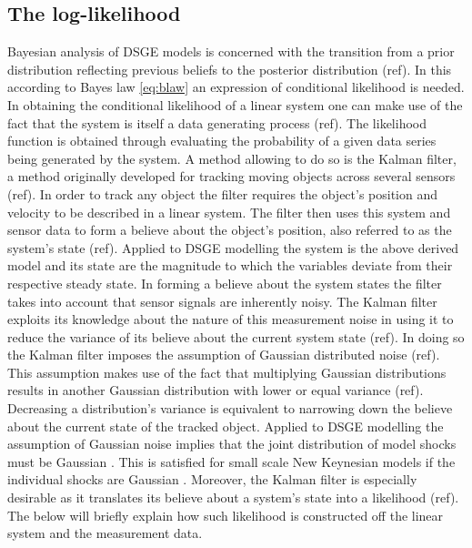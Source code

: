 \documentclass[12pt,a4paper,english]{article} %
\begin{document}
		
	\subsection{The log-likelihood}
	Bayesian analysis of DSGE models is concerned with the transition from a prior distribution reflecting previous beliefs to the posterior distribution (ref). In this according to Bayes law \ref{eq:blaw} an expression of conditional likelihood is needed. 
	In obtaining the conditional likelihood of a linear system one can make use of the fact that the system is itself a data generating process (ref). The likelihood function is obtained through evaluating the probability of a given data series being generated by the system. 
	A method allowing to do so is the Kalman filter, a method originally developed for tracking moving objects across several sensors (ref). In order to track any object the filter requires the object's position and velocity to be described in a linear system. The filter then uses this system and sensor data to form a believe about the object's position, also referred to as the system's state (ref). Applied to DSGE modelling the system is the above derived model and its state are the magnitude to which the variables deviate from their respective steady state.	
	In forming a believe about the system states the filter takes into account that sensor signals are inherently noisy. The Kalman filter exploits its knowledge about the nature of this measurement noise in using it to reduce the variance of its believe about the current system state (ref). In doing so the Kalman filter imposes the assumption of Gaussian distributed noise (ref). This assumption makes use of the fact that multiplying Gaussian distributions results in another Gaussian distribution with lower or equal variance (ref). Decreasing a distribution's variance is equivalent to narrowing down the believe about the current state of the tracked object. Applied to DSGE modelling the assumption of Gaussian noise implies that the joint distribution of model shocks must be Gaussian \cite{herbst_bayesian_2016}. This is satisfied for small scale New Keynesian models if the individual shocks are Gaussian \cite{herbst_bayesian_2016}. 	
	Moreover, the Kalman filter is especially desirable as it translates its believe about a system's state into a likelihood (ref). The below will briefly explain how such likelihood is constructed off the linear system and the measurement data.\\
	
\end{document}
